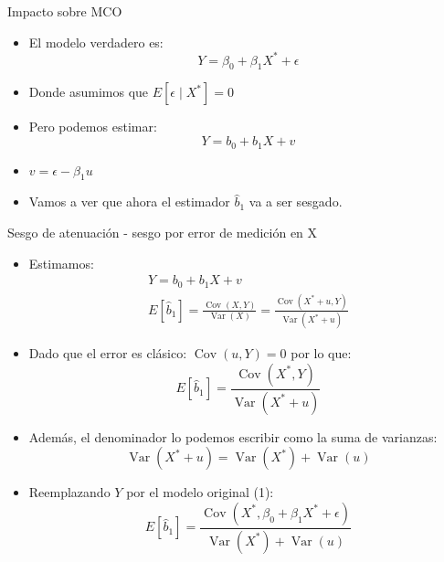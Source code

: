 \documentclass[10pt]{beamer}
\begin{document}
\begin{frame}{Impacto sobre MCO}
    \begin{itemize}
        \item El modelo verdadero es:
        \begin{equation*}
        Y=\beta_{0}+\beta_{1} X^{*}+\epsilon \tag{1}
        \end{equation*}
        \item Donde asumimos que $E\left[\epsilon \mid X^{*}\right]=0$
        \item Pero podemos estimar:
        \begin{equation*}
            Y=b_{0}+b_{1} X+v \tag{2}
        \end{equation*}

        \item $v=\epsilon-\beta_1u$
        \item Vamos a ver que ahora el estimador $\hat{b}_1$ va a ser sesgado.
    \end{itemize}
\end{frame}

\begin{frame}{Sesgo de atenuaci\'on - sesgo por error de medici\'on en X}
    \begin{itemize}
        \item Estimamos:
        $$
        \begin{gathered}
        Y=b_{0}+b_{1} X+v \\
        E\left[\hat{b}_{1}\right]=\frac{\operatorname{Cov}(X, Y)}{\operatorname{Var}(X)}=\frac{\operatorname{Cov}\left(X^{*}+u, Y\right)}{\operatorname{Var}\left(X^{*}+u\right)}
        \end{gathered}
        $$
        \item Dado que el error es clásico: $\operatorname{Cov}(u, Y)=0$ por lo que:
        $$
        E\left[\hat{b}_{1}\right]=\frac{\operatorname{Cov}\left(X^{*}, Y\right)}{\operatorname{Var}\left(X^{*}+u\right)}
        $$
        \item Además, el denominador lo podemos escribir como la suma de varianzas:
        $$
        \operatorname{Var}\left(X^{*}+u\right)=\operatorname{Var}\left(X^{*}\right)+\operatorname{Var}(u)
        $$
        \item Reemplazando $Y$ por el modelo original (1):
        $$
        E\left[\hat{b}_{1}\right]=\frac{\operatorname{Cov}\left(X^{*}, \beta_{0}+\beta_{1} X^{*}+\epsilon\right)}{\operatorname{Var}\left(X^{*}\right)+\operatorname{Var}(u)}
        $$
    \end{itemize}
\end{frame}
\end{document}
